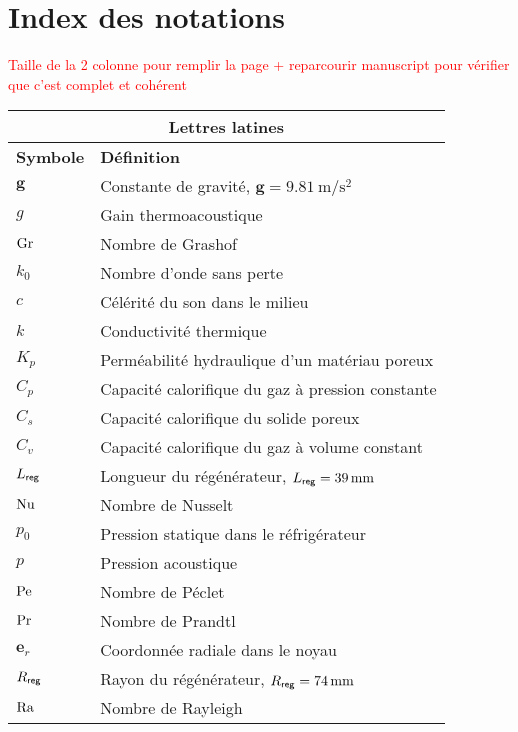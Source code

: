 \chapter{Index des notations}\label{chap:IndexNotations}%

\textcolor{red}{Taille de la 2\ieme{} colonne pour remplir la page + reparcourir manuscript pour vérifier que c'est complet et cohérent}

\begin{center}
    \begin{tabular}{ll}
        \multicolumn{2}{c}{Lettres latines}  \\\hline
        \textbf{Symbole} & \textbf{Définition} \\\hline\hline
        $\mathbf{g}$ & Constante de gravité, $\mathbf{g}=\qty{9.81}{\meter\per\second\squared}$ \\
        $g$ & Gain thermoacoustique \\
        $\mathrm{Gr}$ & Nombre de Grashof \\
        $k_0$ & Nombre d'onde sans perte \\
        $c$ & Célérité du son dans le milieu \\
        $k$ & Conductivité thermique \\
        $K_p$ & Perméabilité hydraulique d'un matériau poreux \\
        $C_p$ & Capacité calorifique du gaz à pression constante \\
        $C_s$ & Capacité calorifique du solide poreux \\
        $C_v$ & Capacité calorifique du gaz à volume constant \\
        $L_{\sf reg}$ & Longueur du régénérateur, $L_{\sf reg}=\qty{39}{\milli\meter}$ \\
        $\mathrm{Nu}$ & Nombre de Nusselt \\
        $p_0$ & Pression statique dans le réfrigérateur \\
        $p$ & Pression acoustique \\
        $\mathrm{Pe}$ & Nombre de Péclet \\
        $\mathrm{Pr}$ & Nombre de Prandtl \\
        $\mathbf{e}_r$ & Coordonnée radiale dans le noyau \\
        $R_{\sf reg}$ & Rayon du régénérateur, $R_{\sf reg}=\qty{74}{\milli\meter}$ \\
        $\mathrm{Ra}$ & Nombre de Rayleigh \\

\end{tabular}
\end{center}
